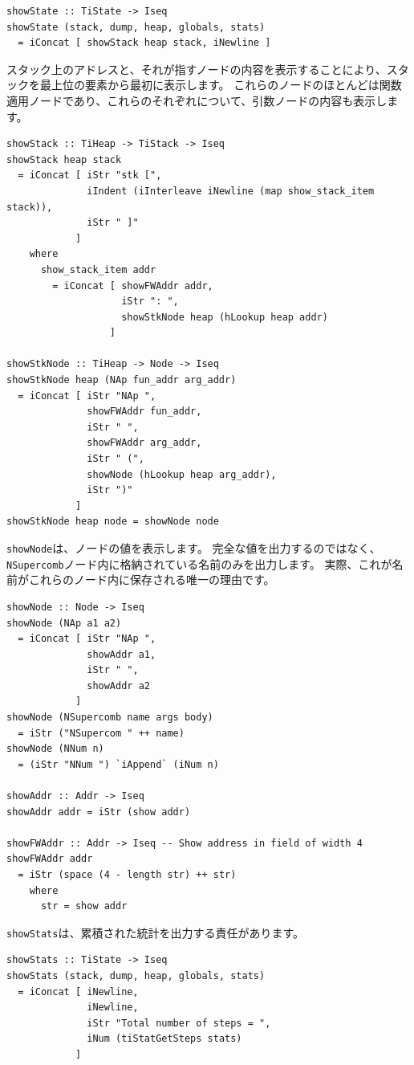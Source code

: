 \documentclass{jbook}
\begin{document}
\begin{verbatim}
showState :: TiState -> Iseq
showState (stack, dump, heap, globals, stats)
  = iConcat [ showStack heap stack, iNewline ]
\end{verbatim}

スタック上のアドレスと、それが指すノードの内容を表示することにより、スタックを最上位の要素から最初に表示します。
これらのノードのほとんどは関数適用ノードであり、これらのそれぞれについて、引数ノードの内容も表示します。

\begin{verbatim}
showStack :: TiHeap -> TiStack -> Iseq
showStack heap stack
  = iConcat [ iStr "stk [",
              iIndent (iInterleave iNewline (map show_stack_item stack)),
              iStr " ]"
            ]
    where
      show_stack_item addr
        = iConcat [ showFWAddr addr,
                    iStr ": ",
                    showStkNode heap (hLookup heap addr)
                  ]

showStkNode :: TiHeap -> Node -> Iseq
showStkNode heap (NAp fun_addr arg_addr)
  = iConcat [ iStr "NAp ",
              showFWAddr fun_addr,
              iStr " ",
              showFWAddr arg_addr,
              iStr " (",
              showNode (hLookup heap arg_addr),
              iStr ")"
            ]
showStkNode heap node = showNode node
\end{verbatim}

\texttt{showNode}は、ノードの値を表示します。
完全な値を出力するのではなく、\texttt{NSupercomb}ノード内に格納されている名前のみを出力します。
実際、これが名前がこれらのノード内に保存される唯一の理由です。

\begin{verbatim}
showNode :: Node -> Iseq
showNode (NAp a1 a2)
  = iConcat [ iStr "NAp ",
              showAddr a1,
              iStr " ",
              showAddr a2
            ]
showNode (NSupercomb name args body)
  = iStr ("NSupercom " ++ name)
showNode (NNum n)
  = (iStr "NNum ") `iAppend` (iNum n)

showAddr :: Addr -> Iseq
showAddr addr = iStr (show addr)

showFWAddr :: Addr -> Iseq -- Show address in field of width 4
showFWAddr addr
  = iStr (space (4 - length str) ++ str)
    where
      str = show addr
\end{verbatim}

\texttt{showStats}は、累積された統計を出力する責任があります。

\begin{verbatim}
showStats :: TiState -> Iseq
showStats (stack, dump, heap, globals, stats)
  = iConcat [ iNewline,
              iNewline,
              iStr "Total number of steps = ",
              iNum (tiStatGetSteps stats)
            ]
\end{verbatim}
\end{document}
